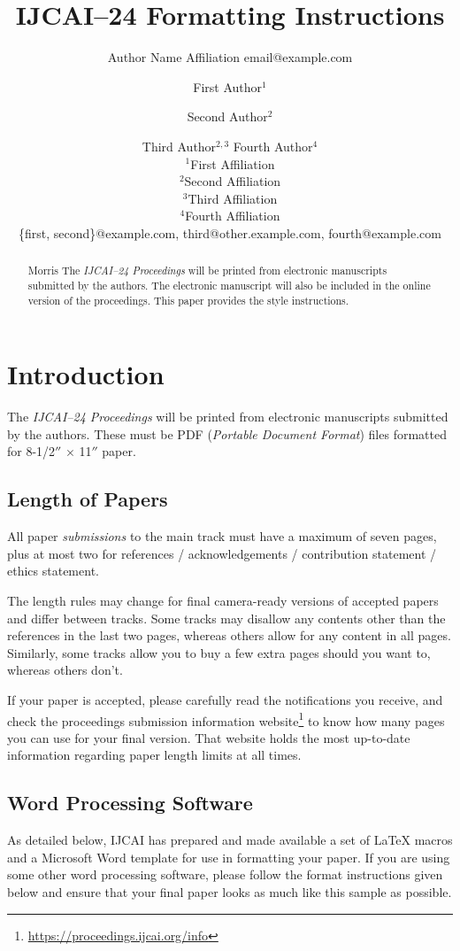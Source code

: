 \documentclass{article}
\title{IJCAI--24 Formatting Instructions}
\author{
    Author Name
    \affiliations
    Affiliation
    \emails
    email@example.com
}
\author{
First Author$^1$
\and
Second Author$^2$\and
Third Author$^{2,3}$\And
Fourth Author$^4$\\
\affiliations
$^1$First Affiliation\\
$^2$Second Affiliation\\
$^3$Third Affiliation\\
$^4$Fourth Affiliation\\
\emails
\{first, second\}@example.com,
third@other.example.com,
fourth@example.com
}
\begin{document}
\maketitle

\begin{abstract}
    Morris The {\it IJCAI--24 Proceedings} will be printed from electronic
    manuscripts submitted by the authors. The electronic manuscript will
    also be included in the online version of the proceedings. This paper
    provides the style instructions.
\end{abstract}

\section{Introduction}

The {\it IJCAI--24 Proceedings} will be printed from electronic
manuscripts submitted by the authors. These must be PDF ({\em Portable
        Document Format}) files formatted for 8-1/2$''$ $\times$ 11$''$ paper.

\subsection{Length of Papers}


All paper {\em submissions} to the main track must have a maximum of seven pages, plus at most two for references / acknowledgements / contribution statement / ethics statement.

The length rules may change for final camera-ready versions of accepted papers and
differ between tracks. Some tracks may disallow any contents other than the references in the last two pages, whereas others allow for any content in all pages. Similarly, some tracks allow you to buy a few extra pages should you want to, whereas others don't.

If your paper is accepted, please carefully read the notifications you receive, and check the proceedings submission information website\footnote{\url{https://proceedings.ijcai.org/info}} to know how many pages you can use for your final version. That website holds the most up-to-date information regarding paper length limits at all times.


\subsection{Word Processing Software}

As detailed below, IJCAI has prepared and made available a set of
\LaTeX{} macros and a Microsoft Word template for use in formatting
your paper. If you are using some other word processing software, please follow the format instructions given below and ensure that your final paper looks as much like this sample as possible.
\end{document}
